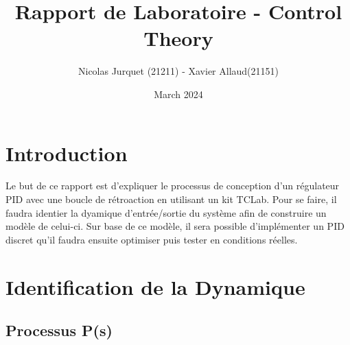 \documentclass{article}
\title{Rapport de Laboratoire - Control Theory}
\author{Nicolas Jurquet (21211) - Xavier Allaud(21151)}
\date{March 2024}
\begin{document}
\maketitle

\section{Introduction}
Le but de ce rapport est d'expliquer le processus de conception d'un régulateur PID avec une boucle de rétroaction en utilisant un kit TCLab. Pour se faire, il faudra identier la dyamique d'entrée/sortie du système afin de construire un modèle de celui-ci. Sur base de ce modèle, il sera possible d'implémenter un PID discret qu'il faudra ensuite optimiser puis tester en conditions réelles.
\tableofcontents

\newpage

\section{Identification de la Dynamique}

\subsection{Processus P(s)}
\end{document}
